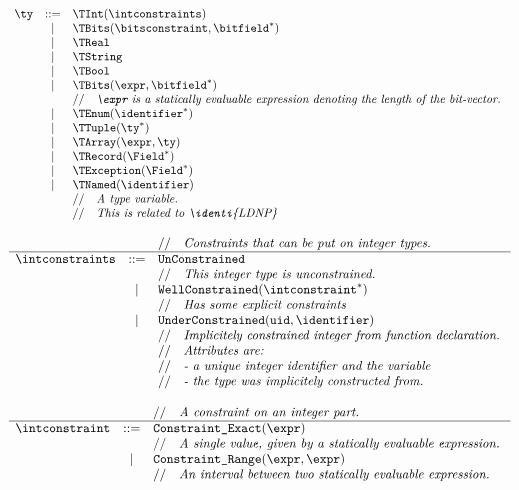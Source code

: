 \documentclass{book}
\begin{document}
\[
\begin{array}{rcl}
\ty &::=& \TInt(\intconstraints) \\
  &|& \TBits(\bitsconstraint, \bitfield^{*}) \\
  &|& \TReal \\
  &|& \TString \\
  &|& \TBool \\
  &|& \TBits(\expr, \bitfield^{*}) \\
  & & \ASTComment{\expr\ is a statically evaluable expression denoting the length of the bit-vector.}\\
  &|& \TEnum(\identifier^{*}) \\
  &|& \TTuple(\ty^{*}) \\
  &|& \TArray(\expr, \ty) \\
  &|& \TRecord(\Field^{*}) \\
  &|& \TException(\Field^{*}) \\
  &|& \TNamed(\identifier)\\
  & & \ASTComment{A type variable.}\\
  & & \ASTComment{This is related to \identi{LDNP}}
\end{array}
\]

\[
  \begin{array}{rcl}
    & & \ASTComment{Constraints that can be put on integer types.}  \\
    \hline
    \intconstraints & ::=
      & \texttt{UnConstrained}                                      \\
    & & \ASTComment{This integer type is unconstrained.}            \\
    &|& \texttt{WellConstrained}(\intconstraint^{*})                \\
    & & \ASTComment{Has some explicit constraints}                  \\
    &|& \texttt{UnderConstrained}(\texttt{uid}, \identifier)        \\
    & & \ASTComment{Implicitely constrained integer from function declaration.} \\
    & & \ASTComment{Attributes are:} \\
    & & \ASTComment{- a unique integer identifier and the variable} \\
    & & \ASTComment{- the type was implicitely constructed from.} \\
  \end{array}
\]

\[
\begin{array}{rcl}
& & \ASTComment{A constraint on an integer part.}\\
\hline
\intconstraint &::=& \texttt{Constraint\_Exact}(\expr) \\
  & & \ASTComment{A single value, given by a statically evaluable expression.}\\
  &|& \texttt{Constraint\_Range}(\expr, \expr) \\
  & & \ASTComment{An interval between two statically evaluable expression.}\\
\end{array}
\]
\end{document}
